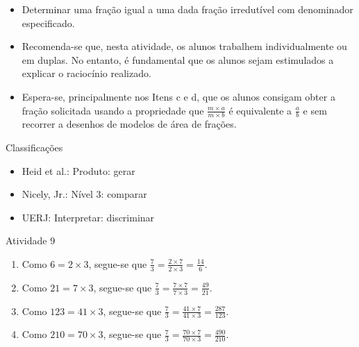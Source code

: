 \documentclass[oneside]{book}
\begin{document}
\begin{multicols}{2}
\begin{itemize} %
    \item       Determinar uma fração igual a uma dada fração irredutível com 
denominador especificado.
\end{itemize} %
  
  
 
  
\begin{itemize} %
    \item       Recomenda-se que, nesta atividade, os alunos trabalhem 
individualmente ou em duplas. No entanto, é fundamental que os alunos sejam 
estimulados a explicar o raciocínio realizado.
    \item       Espera-se, principalmente nos Itens c e d, que os alunos 
consigam obter a fração solicitada usando a propriedade que       $\frac{m 
\times a}{m \times b}$       é equivalente a       $\frac{a}{b}$       e sem 
recorrer a desenhos de modelos de área de frações.
\end{itemize} %
  
  
  Classificações  
\begin{itemize} %
    \item       Heid et al.: Produto: gerar
    \item       Nicely, Jr.: Nível 3: comparar
    \item       UERJ: Interpretar: discriminar
\end{itemize} %


\begin{resposta*}{Atividade 9}
\begin{enumerate} [\quad a)] %
    \item       Como       $6 = 2 \times 3$, segue-se que       $\frac{7}{3} = 
\frac{2 \times 7}{2 \times 3} = \frac{14}{6}$.
    \item       Como       $21 = 7 \times 3$, segue-se que       $\frac{7}{3} = 
\frac{7 \times 7}{7 \times 3} = \frac{49}{21}$.
    \item       Como       $123 = 41 \times 3$, segue-se que       $\frac{7}{3} 
= \frac{41 \times 7}{41 \times 3} = \frac{287}{123}$.
    \item       Como       $210 = 70 \times 3$, segue-se que       $\frac{7}{3} 
= \frac{70 \times 7}{70 \times 3} = \frac{490}{210}$.
\end{enumerate} %
\end{resposta*}


\end{multicols}
\end{document}
